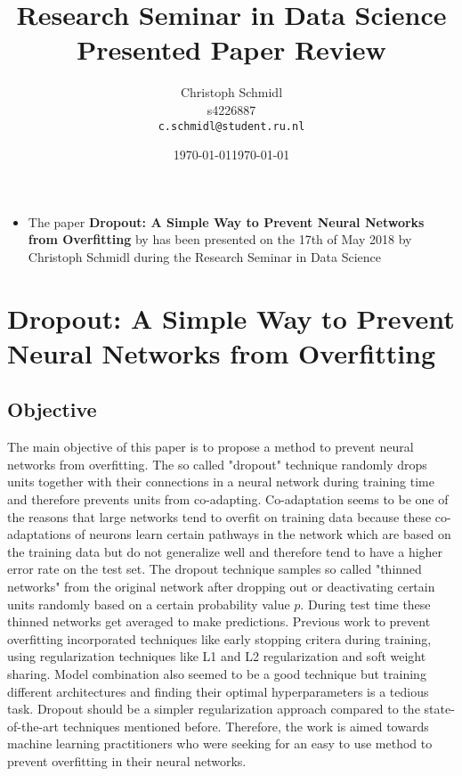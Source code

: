 \documentclass[a4paper]{article}
\title{Research Seminar in Data Science\\Presented Paper Review}
\author{
  Christoph Schmidl\\ s4226887\\      \texttt{c.schmidl@student.ru.nl}
}
\date{\today}
\date{\today}
\begin{document}
\maketitle

\begin{itemize}
	\item The paper \textbf{Dropout: A Simple Way to Prevent Neural Networks from Overfitting} by \cite{Srivastava:2014:DSW:2627435.2670313} has been presented on the 17th of May 2018 by Christoph Schmidl during the Research Seminar in Data Science
\end{itemize}


\section{Dropout: A Simple Way to Prevent Neural Networks from Overfitting}


\subsection{Objective}

The main objective of this paper is to propose a method to prevent neural networks from overfitting. The so called "dropout" technique randomly drops units together with their connections in a neural network during training time and therefore prevents units from co-adapting. Co-adaptation seems to be one of the reasons that large networks tend to overfit on training data because these co-adaptations of neurons learn certain pathways in the network which are based on the training data but do not generalize well and therefore tend to have a higher error rate on the test set. The dropout technique samples so called "thinned networks" from the original network after dropping out or deactivating certain units randomly based on a certain probability value $p$. During test time these thinned networks get averaged to make predictions. Previous work to prevent overfitting incorporated techniques like early stopping critera during training, using regularization techniques like L1 and L2 regularization and soft weight sharing. Model combination also seemed to be a good technique but training different architectures and finding their optimal hyperparameters is a tedious task. Dropout should be a simpler regularization approach compared to the state-of-the-art techniques mentioned before. Therefore, the work is aimed towards machine learning practitioners who were seeking for an easy to use method to prevent overfitting in their neural networks.
\end{document}
